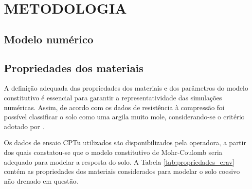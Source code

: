 \chapter{METODOLOGIA}

\section{Modelo numérico}

\section{Propriedades dos materiais}

	A definição adequada das propriedades dos materiais e dos parâmetros do modelo constitutivo é essencial para garantir a representatividade das simulações numéricas. Assim, de acordo com os dados de resistência à compressão foi possível classificar o solo como uma argila muito mole, considerando-se o critério adotado por \citet{maragon2008}.

Os dados de ensaio CPTu utilizados são disponibilizados pela operadora, a partir dos quais constatou-se que o modelo constitutivo de Mohr-Coulomb seria adequado para modelar a resposta do solo. A Tabela \ref{tab:propriedades_crav} contém as propriedades dos materiais considerados para modelar o solo coesivo não drenado em questão.

